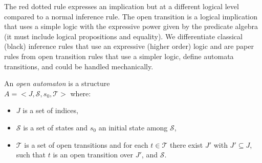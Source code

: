 \documentclass{llncs}
\newcommand{\Ludo}{\\\hfill\mdash Ludo}
\newcommand{\noteLH}[2][color=orange!40, size=\tiny]{\todo[#1]{{#2}\Ludo}}
\newcommand{\mdash}[1][]{---#1}
\newcommand{\goesto}[2][]{\ensuremath{\xrightarrow[{#1}\relax]{#2}}}
\begin{document}



The red dotted rule expresses an implication but at a different logical level compared to  a normal 
inference rule. 
 The open transition is  a logical implication that uses a simple logic with the 
 expressive power  given by the predicate algebra (it must include logical 
 propositions and equality). We differentiate classical (black) inference rules that use 
 an expressive (higher order) logic and are paper rules from open transition rules that use a simpler  logic,  define automata transitions, and could  be handled 
 mechanically.


\begin{definition}
	\label{defn:open-automaton}
	An \emph{open automaton} is a structure\\ $A =
	<J,\mathcal{S},s_0,\mathcal{T}>$ where:
	\begin{itemize}
		\item   $J$ is a  set of indices,
		\item   $\mathcal{S}$ is a set of states and $s_0$ an initial state
		among $\mathcal{S}$,
		\item $\mathcal{T}$ is a set of open transitions and for each
		$t\in \mathcal{T}$ there exist  $J'$ with  $J'
		\subseteq J$, such that $t$ is an open transition over  $J'$,
		and  $\mathcal{S}$.
		
	\end{itemize}
\end{definition}
	

%
\end{document}
